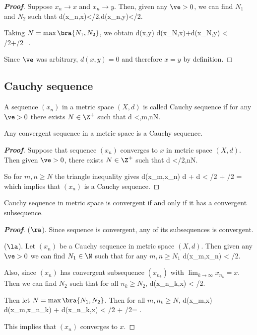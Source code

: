 \begin{proof}[\bf Proof]
Suppose $x_{n}\to x$ and $x_{n}\to y$. Then, given any $\ve>0$, we can find $N_{1}$ and $N_{2}$ such that
\be
d(x_{n},x)<\ve/2\quad {},\qquad d(x_{n},y)<\ve/2\quad {}.
\ee

Taking $N=\max\bra{N_{1},N_{2}}$, we obtain
\be
d(x,y) \leq d(x_{N},x)+d(x_{N},y) < \ve/2+\ve/2=\ve.
\ee

Since $\ve$ was arbitrary, $d(x,y)=0$ and therefore $x=y$ by definition.
\end{proof}

\subsection{Cauchy sequence}

\begin{definition}\label{def:cauchy_sequence_metric_space}
A sequence $(x_n)$ in a metric space $(X,d)$ is called Cauchy sequence if for any $\ve>0$ there exists $N\in \Z^+$ such that
\be
d <\ve,\qquad{}m,n\geq N.
\ee
\end{definition}

\begin{proposition}\label{pro:convergent_sequence_is_cauchy_sequence_metric}
Any convergent sequence in a metric space is a Cauchy sequence.
\end{proposition}

\begin{proof}[\bf Proof]
Suppose that sequence $(x_n)$ converges to $x$ in metric space $(X,d)$. Then given $\ve>0$, there exists $N\in \Z^+$ such that
\be
d <\ve/2,\quad {}n\geq N.
\ee

So for $m,n\geq N$ the triangle inequality gives
\be
d(x_m,x_n) \leq d + d < \ve/2 + \ve/2 = \ve
\ee
which implies that $(x_n)$ is a Cauchy sequence.
\end{proof}


\begin{theorem}\label{thm:cauchy_sequence_convergent_iff_convergent_subsequence}
Cauchy sequence in metric space is convergent if and only if it has a convergent subsequence.
\end{theorem}

\begin{proof}[\bf Proof]
($\ra$). Since sequence is convergent, any of its subsequences is convergent.

($\la$). Let $(x_n)$ be a Cauchy sequence in metric space $(X,d)$. Then given any $\ve>0$ we can find $N_1\in \N$ such that for any $m,n\geq N_1$
\be
d(x_m,x_n) < \ve/2.
\ee

Also, since $(x_n)$ has convergent subsequence $(x_{n_k})$ with $\lim_{k\to \infty} x_{n_k} = x$. Then we can find $N_2$ such that for all $n_k \geq N_2$,
\be
d(x_{n_k},x) < \ve/2.
\ee

Then let $N = \max\bra{N_1,N_2}$. Then for all $m,n_{k}\geq N$,
\be
d(x_m,x) \leq d(x_m,x_{n_k}) + d(x_{n_k},x) < \ve/2 + \ve/2= \ve.
\ee

This implies that $(x_n)$ converges to $x$.
\end{proof}


